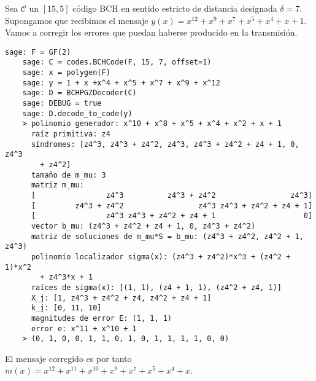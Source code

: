 \begin{example}
  Sea \(\mathcal C\) un \([15, 5]\) código BCH en sentido estricto de distancia designada \(\delta = 7\).
  Supongamos que recibimos el mensaje \(y(x) = x^{12} + x^9 + x^7 + x^5 + x^4 + x + 1\).
  Vamos a corregir los errores que puedan haberse producido en la transmisión.
  \begin{lstlisting}[gobble=4, breaklines=false, basicstyle=\small\ttfamily]
    sage: F = GF(2)
    sage: C = codes.BCHCode(F, 15, 7, offset=1)
    sage: x = polygen(F)
    sage: y = 1 + x +x^4 + x^5 + x^7 + x^9 + x^12
    sage: D = BCHPGZDecoder(C)
    sage: DEBUG = true
    sage: D.decode_to_code(y)
    > polinomio generador: x^10 + x^8 + x^5 + x^4 + x^2 + x + 1
      raíz primitiva: z4
      síndromes: [z4^3, z4^3 + z4^2, z4^3, z4^3 + z4^2 + z4 + 1, 0, z4^3
        + z4^2]
      tamaño de m_mu: 3
      matriz m_mu: 
      [                z4^3          z4^3 + z4^2                 z4^3]
      [         z4^3 + z4^2                 z4^3 z4^3 + z4^2 + z4 + 1]
      [                z4^3 z4^3 + z4^2 + z4 + 1                    0]
      vector b_mu: (z4^3 + z4^2 + z4 + 1, 0, z4^3 + z4^2)
      matriz de soluciones de m_mu*S = b_mu: (z4^3 + z4^2, z4^2 + 1, z4^3)
      polinomio localizador sigma(x): (z4^3 + z4^2)*x^3 + (z4^2 + 1)*x^2 
        + z4^3*x + 1
      raíces de sigma(x): [(1, 1), (z4 + 1, 1), (z4^2 + z4, 1)]
      X_j: [1, z4^3 + z4^2 + z4, z4^2 + z4 + 1]
      k_j: [0, 11, 10]
      magnitudes de error E: (1, 1, 1)
      error e: x^11 + x^10 + 1
    > (0, 1, 0, 0, 1, 1, 0, 1, 0, 1, 1, 1, 1, 0, 0)
  \end{lstlisting}
  El mensaje corregido es por tanto \(m(x) = x^{12} + x^{11} + x^{10} + x^9 + x^7 + x^5 + x^4 + x\).
\end{example}

